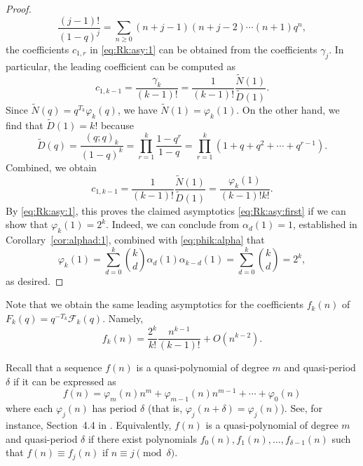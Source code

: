\documentclass[11pt]{article}
\theoremstyle{plain}
\theoremstyle{definition}
\begin{document}
\begin{proof}
\begin{equation*}
    \frac{(j - 1) !}{(1 - q)^j} = \sum_{n \geq 0} (n + j - 1) (n + j -
     2) \cdots (n + 1) q^n,
  \end{equation*}
  the coefficients $c_{1, r}$ in \eqref{eq:Rk:asy:1} can be obtained from the
  coefficients $\gamma_j$. In particular, the leading coefficient can be
  computed as
  \begin{equation*}
    c_{1, k - 1} = \frac{\gamma_k}{(k - 1) !} = \frac{1}{(k - 1) !} 
     \frac{\tilde{N} (1)}{\tilde{D} (1)} .
  \end{equation*}
  Since $\tilde{N} (q) = q^{T_k} \varphi_k (q)$, we have $\tilde{N} (1) =
  \varphi_k (1)$. On the other hand, we find that $\tilde{D} (1) = k!$ because
  \begin{equation*}
    \tilde{D} (q) = \frac{(q ; q)_k}{(1 - q)^k} = \prod_{r = 1}^k \frac{1 -
     q^r}{1 - q} = \prod_{r = 1}^k (1 + q + q^2 + \cdots + q^{r - 1}) .
  \end{equation*}
  Combined, we obtain
  \begin{equation*}
    c_{1, k - 1} = \frac{1}{(k - 1) !}  \frac{\tilde{N} (1)}{\tilde{D} (1)} =
     \frac{\varphi_k (1)}{(k - 1) !k!} .
  \end{equation*}
  By \eqref{eq:Rk:asy:1}, this proves the claimed asymptotics
  \eqref{eq:Rk:asy:first} if we can show that $\varphi_k (1) = 2^k$. Indeed,
  we can conclude from $\alpha_d (1) = 1$, established in
  Corollary~\ref{cor:alphad:1}, combined with \eqref{eq:phik:alpha} that
  \begin{equation*}
    \varphi_k (1) = \sum_{d = 0}^k \binom{k}{d} \alpha_d (1) \alpha_{k - d}
     (1) = \sum_{d = 0}^k \binom{k}{d} = 2^k,
  \end{equation*}
  as desired.
\end{proof}

\begin{remark}
  Note that we obtain the same leading asymptotics for the coefficients $f_k
  (n)$ of $F_k (q) = q^{- T_k} \mathcal{F}_k (q)$. Namely,
  \begin{equation*}
    f_k (n) = \frac{2^k}{k!} \frac{n^{k - 1}}{(k - 1) !} + O (n^{k - 2}) .
  \end{equation*}
\end{remark}

Recall that a sequence $f (n)$ is a quasi-polynomial of degree $m$ and
quasi-period $\delta$ if it can be expressed as
\begin{equation*}
  f (n) = \varphi_m (n) n^m + \varphi_{m - 1} (n) n^{m - 1} + \cdots +
   \varphi_0 (n)
\end{equation*}
where each $\varphi_j (n)$ has period $\delta$ (that is, $\varphi_j (n +
\delta) = \varphi_j (n)$). See, for instance, Section~4.4 in
\cite{stanley-ec1}. Equivalently, $f (n)$ is a quasi-polynomial of degree
$m$ and quasi-period $\delta$ if there exist polynomials $f_0 (n), f_1 (n),
\ldots, f_{\delta - 1} (n)$ such that $f (n) \equiv f_j (n)$ if $n \equiv j
\pmod{\delta}$.
\end{document}
